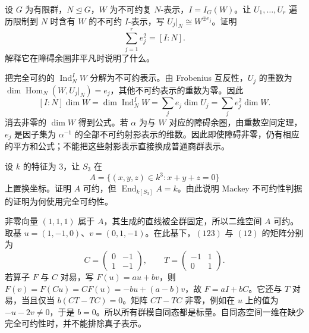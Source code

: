 \begin{exercise}\label{b5:ex:04-clifford-square-sum}
	设 \(G\) 为有限群，\(N\trianglelefteq G\)，\(W\) 为不可约复 \(N\)-表示，\(I=I_G(W)\)。让 \(U_1,\ldots,U_r\) 遍历限制到 \(N\) 时含有 \(W\) 的不可约 \(I\)-表示，写 \(U_j|_N\cong W^{\oplus e_j}\)。证明
	\[
		\sum_{j=1}^r e_j^2=[I:N].
	\]
	解释它在障碍余圈非平凡时说明了什么。
\end{exercise}
\begin{solution}
	把完全可约的 \(\operatorname{Ind}_N^I W\) 分解为不可约表示。由 Frobenius 互反性，\(U_j\) 的重数为 \(\dim\operatorname{Hom}_N(W,U_j|_N)=e_j\)，其他不可约表示的重数为零。因此
	\[
		[I:N]\dim W =\dim\operatorname{Ind}_N^I W =\sum_j e_j\dim U_j =\sum_j e_j^2\dim W.
	\]
	消去非零的 \(\dim W\) 得到公式。若 \(\alpha\) 为与 \(W\) 对应的障碍余圈，由重数空间定理，\(e_j\) 是因子集为 \(\alpha^{-1}\) 的全部不可约射影表示的维数。因此即使障碍非零，仍有相应的平方和公式；不能把这些射影表示直接换成普通商群表示。
\end{solution}

\begin{exercise}\label{b5:ex:04-schurian-not-simple}
	设 \(k\) 的特征为 \(3\)，让 \(S_3\) 在
	\[
		A=\bigl\{(x,y,z)\in k^3:x+y+z=0\bigr\}
	\]
	上置换坐标。证明 \(A\) 可约，但 \(\operatorname{End}_{k[S_3]}A=k\)。由此说明 Mackey 不可约性判据的证明为何使用完全可约性。
\end{exercise}
\begin{solution}
	非零向量 \((1,1,1)\) 属于 \(A\)，其生成的直线被全群固定，所以二维空间 \(A\) 可约。取基 \(u=(1,-1,0)\)、\(v=(0,1,-1)\)。在此基下，\((123)\) 与 \((12)\) 的矩阵分别为
	\[
		C=\begin{pmatrix}0&-1\\1&-1\end{pmatrix},
		\qquad
		T=\begin{pmatrix}-1&1\\0&1\end{pmatrix}.
	\]
	若算子 \(F\) 与 \(C\) 对易，写 \(F(u)=au+bv\)，则 \(F(v)=F(Cu)=CF(u)=-bu+(a-b)v\)，故 \(F=aI+bC\)。它还与 \(T\) 对易，当且仅当 \(b(CT-TC)=0\)。矩阵 \(CT-TC\) 非零，例如在 \(u\) 上的值为 \(-u-2v\neq0\)，于是 \(b=0\)。所以所有群模自同态都是标量。自同态空间一维在缺少完全可约性时，并不能排除真子表示。
\end{solution}

